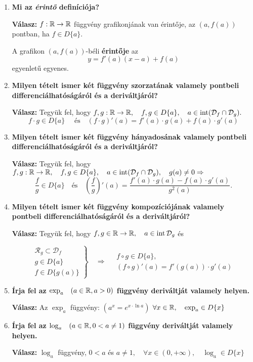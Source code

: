 \documentclass[a4paper,11.5pt]{article}
\DeclareMathOperator{\Int}{int}
\begin{document}
\begin{enumerate}
		\item\textbf{Mi az \textit{érintő} definíciója?}
		
		\textbf{Válasz:}
		$f:\mathbb{R}\to\mathbb{R}$ függvény grafikonjának van érintője, az $(a,f(a))$ pontban, ha $f\in D\{a\}$.
		
		\smallskip
		A grafikon $(a,f(a))$-béli \textbf{érintője} az
		\[ y=f'(a)(x-a)+f(a) \]
		egyenletű egyenes.
		
		\item \textbf{Milyen tételt ismer két függvény szorzatának valamely pontbeli differenciálhatóságáról és a deriváltjáról?}
		
		\textbf{Válasz:} 
		Tegyük fel, hogy $f,g:\R\to\R, \quad f,g\in D\{a\},\quad a\in \Int(\mathcal{D}_f\cap\mathcal{D}_g).$
		 \[f\cdot g\in D\{a\}\quad \text{ és} \quad (f\cdot g)'(a)=f'(a)\cdot g(a)+f(a)\cdot g'(a)\]
		
		\item\textbf{Milyen tételt ismer két függvény hányadosának valamely pontbeli differenciálhatóságáról és a deriváltjáról?}
		
		\textbf{Válasz:}
		Tegyük fel, hogy $f,g:\R\to\R, \quad f,g\in D\{a\},\quad a\in \Int(\mathcal{D}_f\cap\mathcal{D}_g),\quad g(a)\not=0\Rightarrow$
		\[ \frac{f}{g}\in D\{a\}\quad \text{és}\quad \left(\frac{f}{g}\right)'(a)=\frac{f'(a)\cdot g(a)-f(a)\cdot g'(a)}{g^2(a)}. \]
		\item\textbf{Milyen tételt ismer két függvény kompozíciójának valamely pontbeli differenciálhatóságáról és a deriváltjáról?}
		
		\textbf{Válasz:}
		Tegyük fel, hogy $f,g\in\R\to\R,\quad a\in\Int\mathcal{D}_g$ és
		
		\[\left.\begin{gathered}
		\mathcal{R}_g\subset\mathcal{D}_f\\
		g\in D\{a\}\\
		f\in D\{g(a) \}
		\end{gathered}\right\}\quad \Rightarrow\quad \begin{gathered}
		f\circ g\in D\{a\},\\
		(f\circ g)'(a)=f'(g(a))\cdot g'(a)
		\end{gathered}\]
		\item\textbf{Írja fel az $\exp_a\quad (a\in\mathbb{R}, a>0)$ függvény deriváltját valamely helyen.}
		
		\textbf{Válasz:}
		Az $\exp_a$ függvény: \quad $(a^x=e^{x\cdot\ln a})$
		\quad $\forall x\in\mathbb{R},\quad \exp_a\in D\{x\}$
		\begin{center}
		\end{center}
		\item\textbf{Írja fel az $\log_a\quad (a\in\mathbb{R}, 0<a\not=1)$ függvény deriváltját valamely helyen.}
		
		\textbf{Válasz:}
		$\log_a$ függvény, $0<a$ és $a\not=1, \quad  \forall x\in(0,+\infty),\quad \log_a\in D\{x\} $
		\begin{center}
		\end{center}
	\end{enumerate}
\end{document}
